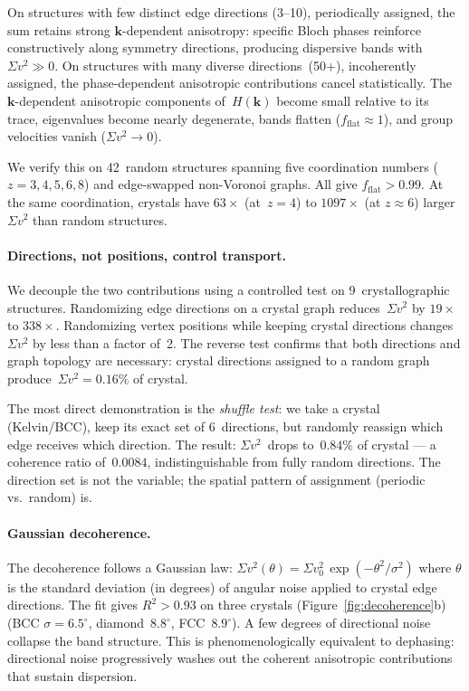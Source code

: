 \documentclass[12pt]{article}
\newcommand{\vk}{\bm{k}}
\newcommand{\svtwo}{\Sigma v^2}
\newcommand{\fflat}{f_{\mathrm{flat}}}
\begin{document}
On structures with few distinct edge directions (3--10), periodically
assigned, the sum retains strong $\vk$-dependent anisotropy: specific Bloch
phases reinforce constructively along symmetry directions, producing
dispersive bands with $\svtwo \gg 0$.  On structures with many diverse
directions~(50+), incoherently assigned, the phase-dependent anisotropic
contributions cancel statistically.  The $\vk$-dependent anisotropic
components of~$H(\vk)$ become small relative to its trace, eigenvalues become
nearly degenerate, bands flatten ($\fflat \approx 1$), and group velocities
vanish ($\svtwo \to 0$).

We verify this on 42~random structures spanning five coordination numbers
($z = 3, 4, 5, 6, 8$) and edge-swapped non-Voronoi graphs.  All give
$\fflat > 0.99$.  At the same coordination, crystals have $63\times$
(at~$z=4$) to $1097\times$ (at $z \approx 6$) larger~$\svtwo$ than random
structures.

\paragraph{Directions, not positions, control transport.}
We decouple the two contributions using a controlled test on
9~crystallographic structures.  Randomizing edge directions on a crystal graph
reduces~$\svtwo$ by $19\times$ to $338\times$.  Randomizing vertex positions
while keeping crystal directions changes~$\svtwo$ by less than a factor
of~2.  The reverse test confirms that both directions and graph topology are
necessary: crystal directions assigned to a random graph
produce~$\svtwo = 0.16\%$ of crystal.

The most direct demonstration is the \emph{shuffle test}: we take a crystal
(Kelvin/BCC), keep its exact set of 6~directions, but randomly reassign which
edge receives which direction.  The result: $\svtwo$~drops to~$0.84\%$ of
crystal --- a coherence ratio of~$0.0084$, indistinguishable from fully random
directions.  The direction set is not the variable; the spatial pattern of
assignment (periodic vs.\ random) is.

\paragraph{Gaussian decoherence.}
The decoherence follows a Gaussian law:
$\svtwo(\theta) = \svtwo_0\,\exp(-\theta^2/\sigma^2)$ where $\theta$ is the
standard deviation (in degrees) of angular noise applied to crystal edge directions.  The fit
gives $R^2 > 0.93$ on three crystals (Figure~\ref{fig:decoherence}b) (BCC $\sigma = 6.5^\circ$, diamond~$8.8^\circ$,
FCC~$8.9^\circ$).  A few degrees of directional noise collapse the band structure.
This is phenomenologically equivalent to dephasing: directional noise
progressively washes out the coherent anisotropic contributions that sustain
dispersion.
\end{document}
